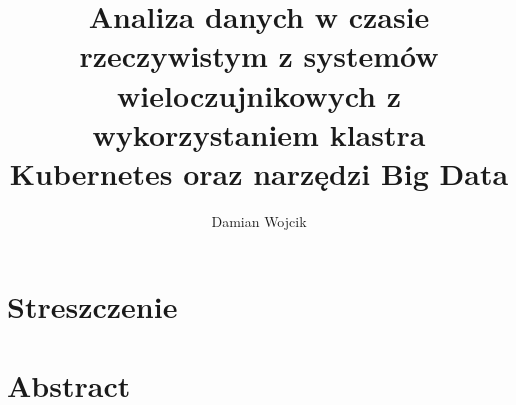 \documentclass[12pt]{przejsciowka}
\title{Analiza danych w czasie rzeczywistym z systemów wieloczujnikowych z wykorzystaniem klastra Kubernetes oraz narzędzi Big Data}
\author{Damian Wojcik}
\newcommand{\inputcleanchapter}[1]{%
    \begingroup
    
    \endgroup
}
\begin{document}
    \maketitle
    \tableofcontents
    \clearpage

    \section*{Streszczenie}
    \inputcleanchapter{abstract_pl}
    \clearpage

    \section*{Abstract}
    \inputcleanchapter{abstract_en}
    \clearpage


    \inputcleanchapter{rozdzial1_wprowadzenie}
    \clearpage


    \inputcleanchapter{rozdzial2_przeglad_literatury}
    \clearpage


    \inputcleanchapter{rozdzial3_projekt_systemu}
    \clearpage


    \inputcleanchapter{rozdzial4_implementacja_systemu}
    \clearpage
    
    
    \inputcleanchapter{rozdzial5_algorytmy_analizy}
    \clearpage
    
    
    \inputcleanchapter{rozdzial6_badania}
    \clearpage
    
    
    \inputcleanchapter{rozdzial7_zastosowania}
    \clearpage
    
    
    \inputcleanchapter{rozdzial8_podsumowanie}
    \clearpage

    \listoffigures
    \clearpage

    \listoftables
    \clearpage

    
    \clearpage
\end{document}
